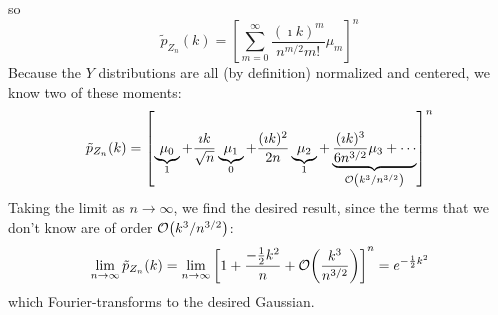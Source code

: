 \documentclass[a4paper,twoside]{article}
\begin{document}
\begin{itemize}
\begin{problem}
            so
            \begin{equation}
                \tilde{p}_{Z_n}(k) = \left[ \sum_{m=0}^{\infty} \frac{(\imath k)^m}{n^{m/2} m!} \mu_m \right]^n
            \end{equation}
            Because the $ Y $ distributions are all (by definition) normalized and centered, we know two of these moments:
            \begin{equation}
                \tilde{p}_{Z_n}(k) = \left[ \underbrace{\mu_0}_{1} + \frac{\imath k}{\sqrt{n}} \underbrace{\mu_1}_{0} + \frac{(\imath k)^2}{2n} \underbrace{\mu_2}_{1} + \underbrace{\frac{(\imath k)^3}{6 n^{3/2}} \mu_3 + \cdots}_{\order{k^3/n^{3/2}}} \right]^n
            \end{equation}
            Taking the limit as $ n \to \infty $, we find the desired result, since the terms that we don't know are of order $ \order{k^3/n^{3/2}} $:
            \begin{equation}
                \lim_{n\to\infty}\tilde{p}_{Z_n}(k) = \lim_{n\to\infty}\left[ 1 + \frac{- \frac{1}{2} k^2}{n} + \order{\frac{k^3}{n^{3/2}}} \right]^n = e^{- \frac{1}{2} k^2}
            \end{equation}
            which Fourier-transforms to the desired Gaussian.
        \end{problem}
    \end{itemize}
\end{document}

